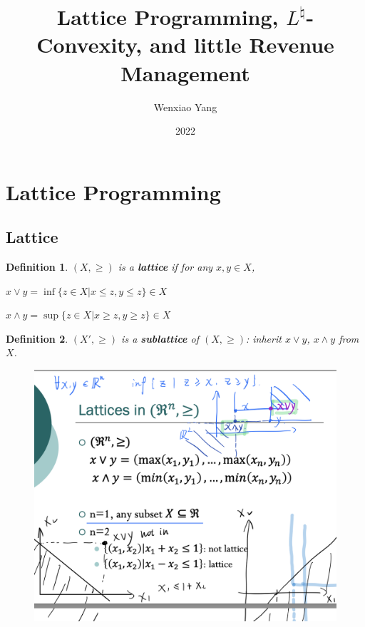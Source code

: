 \documentclass[11pt,a4paper]{article}
\title{Lattice Programming, $L^\natural$-Convexity, and little Revenue Management}
\author[*]{Wenxiao Yang}
\affil[*]{Department of Mathematics, University of Illinois at Urbana-Champaign}
\date{2022}
\newtheorem{definition}{Definition}
\begin{document}
\maketitle
\tableofcontents
\newpage







\section{Lattice Programming}
\subsection{Lattice}
\begin{definition}
    $(X,\geq)$ is a \textbf{lattice} if for any $x,y\in X$,

    \quad $x\vee y=\inf\{z\in X | x\leq z, y\leq z\}\in X$

    \quad $x\wedge y=\sup \{z\in X| x\geq z,y\geq z\}\in X$
\end{definition}

\begin{definition}
    $(X',\geq)$ is a \textbf{sublattice} of $(X,\geq)$: inherit $x\vee y$, $x\wedge y$ from $X$.
\end{definition}

\begin{center}\begin{figure}[htbp]
    \centering
    \includegraphics[scale=0.5]{lattice1.png}
    \caption{}
    \label{}
\end{figure}\end{center}
\end{document}
